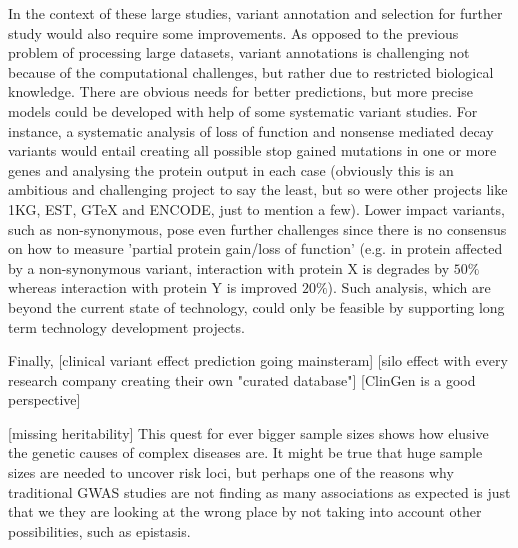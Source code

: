 In the context of these large studies, variant annotation and selection for further study would also require some improvements.
As opposed to the previous problem of processing large datasets, variant annotations is challenging not because of the computational challenges, but rather due to restricted biological knowledge.
There are obvious needs for better predictions, but more precise models could be developed with help of some systematic variant studies.
For instance, a systematic analysis of loss of function and nonsense mediated decay variants would entail creating all possible stop gained mutations in one or more genes and analysing the protein output in each case (obviously this is an ambitious and challenging project to say the least, but so were other projects like 1KG, EST, GTeX and ENCODE, just to mention a few).
Lower impact variants, such as non-synonymous, pose even further challenges since there is no consensus on how to measure 'partial protein gain/loss of function' (e.g. in protein affected by a non-synonymous variant, interaction with protein X is degrades by $50\%$ whereas interaction with protein Y is improved $20\%$).
Such analysis, which are beyond the current state of technology, could only be feasible by supporting long term technology development projects.

Finally, 
[clinical variant effect prediction going mainsteram]
[silo effect with every research company creating their own "curated database"]
[ClinGen is a good perspective]

[missing heritability]
This quest for ever bigger sample sizes shows how elusive the genetic causes of complex diseases are. 
It might be true that huge sample sizes are needed to uncover risk loci, but perhaps one of the reasons why traditional GWAS studies are not finding as many associations as expected is just that we they are looking at the wrong place by not taking into account other possibilities, such as epistasis.

